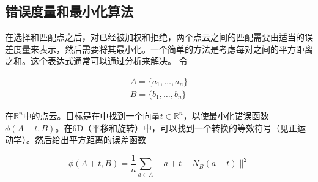 
\subsection{错误度量和最小化算法}
在选择和匹配点之后，对已经被加权和拒绝，两个点云之间的匹配需要由适当的误差度量来表示，然后需要将其最小化。一个简单的方法是考虑每对之间的平方距离之和。这个表达式通常可以通过分析来解决。 令

\begin{eqnarray}
A=\{a_1,\ldots,a_n\}\\
B=\{b_1,\dots,b_n\}
\end{eqnarray}


在$\mathbb{R}^n$中的点云。目标是在中找到一个向量$t\in\mathbb{R}^n$，以使最小化错误函数$\phi(A+t,B)$。在6D（平移和旋转）中，可以找到一个转换的等效符号（见正运动学）。然后给出平方距离的误差函数

\begin{equation}
\phi(A+t,B)=\frac{1}{n}\sum_{a \in A}\|a+t-N_B(a+t)\|^2
\end{equation}



